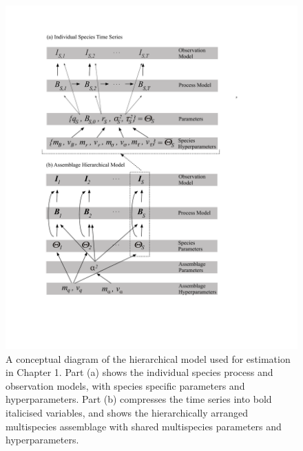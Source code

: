 \documentclass[]{scrartcl}
\begin{document}
\begin{figure}[htbp]
\centering
\includegraphics{figures/HBMClarkCh1.pdf}
\caption{A conceptual diagram of the hierarchical model used for estimation in Chapter 1.  Part (a) shows the individual species process and observation models, with species specific parameters and hyperparameters. Part (b) compresses the time series into bold italicised variables, and shows the hierarchically arranged multispecies assemblage with shared multispecies parameters and hyperparameters.}\label{fig:HBMCh1}
\end{figure}

\newpage
\end{document}
